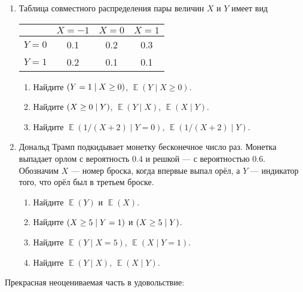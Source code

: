 \documentclass[12pt]{article}
\let\P\relax
\DeclareMathOperator{\P}{\mathbb{P}}
\DeclareMathOperator{\E}{\mathbb{E}}
\begin{document}
\begin{enumerate}
\item Таблица совместного распределения пары величин $X$ и $Y$ имеет вид

\begin{tabular}{*{4}{c}}
\toprule
& $X=-1$ & $X=0$ & $X=1$ \\
\midrule
$Y=0$ & 0.1 & 0.2 & 0.3  \\
$Y=1$ & 0.2 & 0.1 & 0.1  \\
\bottomrule
\end{tabular}

\begin{enumerate}
    \item Найдите $\P(Y = 1 \mid X \geq 0)$, $\E(Y \mid X \geq 0)$.
    \item Найдите $\P(X \geq 0 \mid Y)$, $\E(Y \mid X)$,  $\E(X \mid Y)$.
    \item Найдите $\E(1 / (X + 2) \mid Y = 0)$, $\E(1 / (X + 2) \mid Y)$.
\end{enumerate}

\item Дональд Трамп подкидывает монетку бесконечное число раз. 
Монетка выпадает орлом с вероятность $0.4$ и решкой — с вероятностью $0.6$.
Обозначим $X$ — номер броска, когда впервые выпал орёл, а $Y$ — индикатор того, что орёл был в третьем броске.
\begin{enumerate}
    \item Найдите $\E(Y)$ и $\E(X)$.
    \item Найдите $\P(X \geq 5 \mid Y = 1)$ и $\P(X \geq 5 \mid Y)$.
    \item Найдите $\E(Y \mid X = 5)$, $\E(X \mid Y = 1)$.
    \item Найдите $\E(Y \mid X)$, $\E(X \mid Y)$.
\end{enumerate}

\end{enumerate}

Прекрасная неоцениваемая часть в удовольствие:
\end{document}
